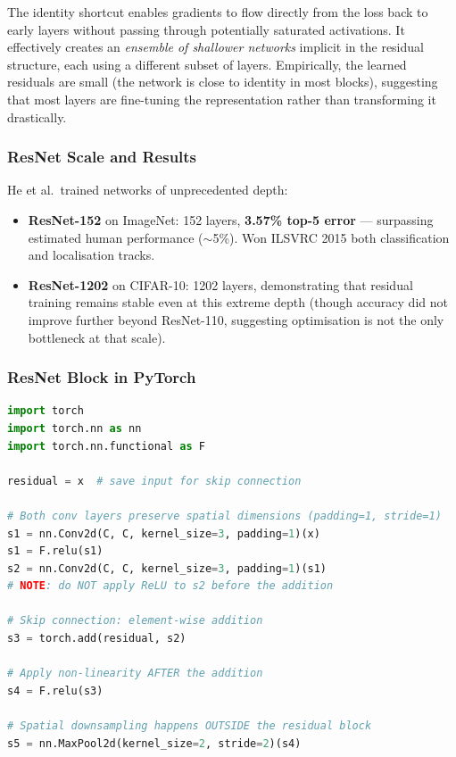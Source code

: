 \documentclass[11pt,a4paper]{article}
\begin{document}
\begin{insightbox}
The identity shortcut enables gradients to flow directly from the loss back to early layers without passing through potentially saturated activations. It effectively creates an \emph{ensemble of shallower networks} implicit in the residual structure, each using a different subset of layers. Empirically, the learned residuals are small (the network is close to identity in most blocks), suggesting that most layers are fine-tuning the representation rather than transforming it drastically.
\end{insightbox}

\subsubsection{ResNet Scale and Results}

He et al.\ trained networks of unprecedented depth:
\begin{itemize}
  \item \textbf{ResNet-152} on ImageNet: 152 layers, \textbf{3.57\% top-5 error} — surpassing estimated human performance ($\sim$5\%). Won ILSVRC 2015 both classification and localisation tracks.
  \item \textbf{ResNet-1202} on CIFAR-10: 1202 layers, demonstrating that residual training remains stable even at this extreme depth (though accuracy did not improve further beyond ResNet-110, suggesting optimisation is not the only bottleneck at that scale).
\end{itemize}

\subsubsection{ResNet Block in PyTorch}

\begin{lstlisting}[language=Python, caption={Residual block in PyTorch}]
import torch
import torch.nn as nn
import torch.nn.functional as F

residual = x  # save input for skip connection

# Both conv layers preserve spatial dimensions (padding=1, stride=1)
s1 = nn.Conv2d(C, C, kernel_size=3, padding=1)(x)
s1 = F.relu(s1)
s2 = nn.Conv2d(C, C, kernel_size=3, padding=1)(s1)
# NOTE: do NOT apply ReLU to s2 before the addition

# Skip connection: element-wise addition
s3 = torch.add(residual, s2)

# Apply non-linearity AFTER the addition
s4 = F.relu(s3)

# Spatial downsampling happens OUTSIDE the residual block
s5 = nn.MaxPool2d(kernel_size=2, stride=2)(s4)
\end{lstlisting}
\end{document}
